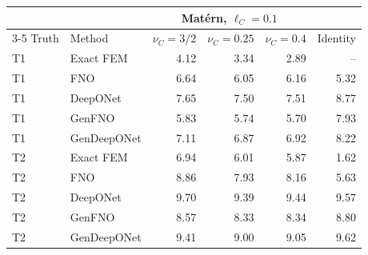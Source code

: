 \begin{tabular}{llrrrr}
\toprule
 & & \multicolumn{3}{c}{Mat\'ern, $\ell_C=0.1$} & \\
\cmidrule(lr){3-5}
Truth & Method & $\nu_C=3/2$ & $\nu_C=0.25$ & $\nu_C=0.4$ & Identity \\
\midrule
T1 & Exact FEM & 4.12 & 3.34 & 2.89 & -- \\
T1 & FNO & 6.64 & 6.05 & 6.16 & 5.32 \\
T1 & DeepONet & 7.65 & 7.50 & 7.51 & 8.77 \\
T1 & GenFNO & 5.83 & 5.74 & 5.70 & 7.93 \\
T1 & GenDeepONet & 7.11 & 6.87 & 6.92 & 8.22 \\
\midrule
T2 & Exact FEM & 6.94 & 6.01 & 5.87 & 1.62 \\
T2 & FNO & 8.86 & 7.93 & 8.16 & 5.63 \\
T2 & DeepONet & 9.70 & 9.39 & 9.44 & 9.57 \\
T2 & GenFNO & 8.57 & 8.33 & 8.34 & 8.80 \\
T2 & GenDeepONet & 9.41 & 9.00 & 9.05 & 9.62 \\
\bottomrule
\end{tabular}
